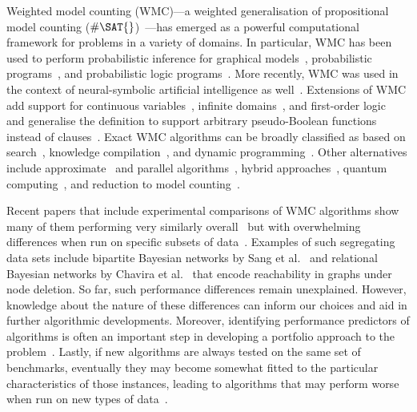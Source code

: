 \documentclass[runningheads]{llncs}
\begin{document}
Weighted model counting (\textsf{WMC})---a weighted generalisation of
propositional model counting
($\#\SAT{}$)~\cite{DBLP:journals/ai/ChaviraD08}---has emerged as a powerful
computational framework for problems in a variety of domains. In particular,
\textsf{WMC} has been used to perform probabilistic inference for graphical
models~\cite{DBLP:conf/ecai/BartKLM16,DBLP:conf/ijcai/ChaviraD05,DBLP:conf/sat/ChaviraD06,DBLP:conf/kr/Darwiche02,DBLP:conf/aaai/SangBK05},
probabilistic programs~\cite{DBLP:journals/pacmpl/HoltzenBM20}, and
probabilistic logic programs~\cite{DBLP:journals/tplp/FierensBRSGTJR15}. More
recently, \textsf{WMC} was used in the context of neural-symbolic artificial
intelligence as well~\cite{DBLP:conf/icml/XuZFLB18}. Extensions of \textsf{WMC}
add support for continuous variables~\cite{DBLP:conf/ijcai/BellePB15}, infinite
domains~\cite{DBLP:conf/aaai/Belle17}, and first-order
logic~\cite{DBLP:journals/cacm/GogateD16,DBLP:conf/ijcai/BroeckTMDR11} and
generalise the definition to support arbitrary pseudo-Boolean functions instead
of clauses~\cite{DBLP:conf/sat/DilkasB21}. Exact \textsf{WMC} algorithms can be
broadly classified as based on
search~\cite{DBLP:conf/sat/SangBBKP04,DBLP:conf/ijcai/SharmaRSM19}, knowledge
compilation~\cite{DBLP:conf/ecai/Darwiche04,DBLP:conf/ijcai/LagniezM17,DBLP:conf/ijcai/OztokD15},
and dynamic programming~\cite{DBLP:conf/aaai/DudekPV20,DBLP:conf/cp/DudekPV20}.
Other alternatives include
approximate~\cite{DBLP:series/faia/ChakrabortyMV21,DBLP:conf/aaai/RenkensKBR14}
and parallel algorithms~\cite{DBLP:conf/pgm/DalLL18,DBLP:conf/esa/FichteHWZ18},
hybrid approaches~\cite{DBLP:conf/sat/HecherTW20}, quantum
computing~\cite{DBLP:conf/ecai/Riguzzi20}, and reduction to model
counting~\cite{DBLP:conf/ijcai/ChakrabortyFMV15}.

Recent papers that include experimental comparisons of \textsf{WMC}
algorithms show many of them performing very similarly
overall~\cite{DBLP:conf/aaai/DudekPV20,DBLP:conf/cp/DudekPV20} but with
overwhelming differences when run on specific subsets of
data~\cite{DBLP:conf/uai/DilkasB21,DBLP:conf/sat/DilkasB21,DBLP:conf/ijcai/LagniezM17}.
Examples of such segregating data sets include bipartite Bayesian networks by
Sang et al.~\cite{DBLP:conf/aaai/SangBK05} and
relational Bayesian networks by
Chavira et al.~\cite{DBLP:journals/ijar/ChaviraDJ06}
that encode reachability in graphs under node deletion. So far, such performance
differences remain unexplained. However, knowledge about the nature of these
differences can inform our choices and aid in further algorithmic developments.
Moreover, identifying performance predictors of algorithms is often an important
step in developing a portfolio approach to the
problem~\cite{DBLP:journals/jair/XuHHL08}. Lastly, if new algorithms are always
tested on the same set of benchmarks, eventually they may become somewhat fitted
to the particular characteristics of those instances, leading to algorithms that
may perform worse when run on new types of
data~\cite{DBLP:conf/cec/HossainALA10}.
\end{document}
